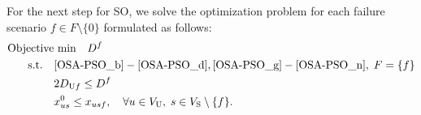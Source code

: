 \documentclass[conference]{IEEEtran}
\newcommand\red[1]{\textcolor{red}{#1}}
\begin{document}
\begin{CJK}{UTF8}{ipxm}
For the next step for SO, we solve the optimization problem for each failure scenario $f \in F \setminus \{0\}$ formulated as follows:
\begin{subequations} \label{OSA-SO}
  \begin{align}
  \text{Objective}&\text{ min}\quad D^f \label{OSA-SO_a} \\
  \rm{s.t.} \quad
  & \eqref{OSA-PSO_b}-\eqref{OSA-PSO_d}, \eqref{OSA-PSO_g}-\eqref{OSA-PSO_n}, \; F = \{f\} \label{OSA-SO_b-d,g-n} \\
  &2D_{\mathrm{U}f} \le D^f \label{OSA-SO_h} \\
  &x^0_{us} \le x_{usf}, \quad \forall u \in V_{\rm{U}}, \; s \in V_{\rm{S}} \setminus \{f\}. \label{OSA-SO_i}
  \end{align}
\end{subequations}

\end{CJK}
\end{document}
